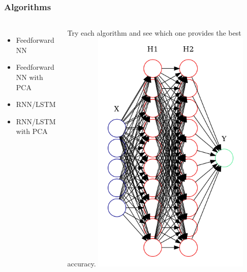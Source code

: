 \documentclass{beamer}
\begin{document}
\begin{frame}
	\frametitle{Algorithms}
	\begin{columns}
		\begin{itemize}
			\item
				Feedforward NN
			\item
				Feedforward NN with PCA
			\item
				RNN/LSTM
			\item
				RNN/LSTM with PCA
		\end{itemize}

		Try each algorithm and see which one provides the best accuracy.
		\includegraphics[width=0.75\textwidth]{images/nngraph.png}
	\end{columns}
\end{frame}
\end{document}
